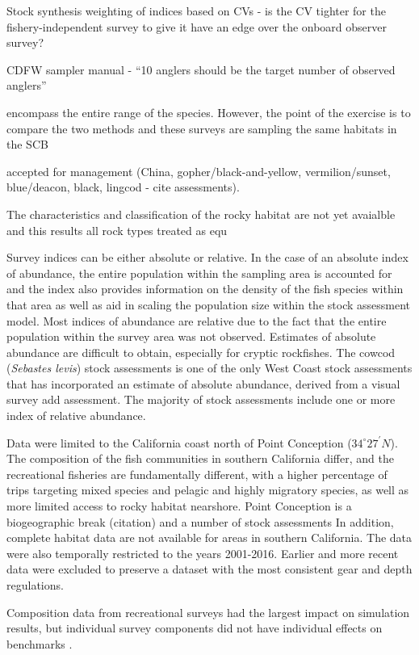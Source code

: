\documentclass[
  authoryear,
  preprint,
  3p]{elsarticle}
\begin{document}
Stock synthesis weighting of indices based on CVs - is the CV tighter
for the fishery-independent survey to give it have an edge over the
onboard observer survey?

CDFW sampler manual - ``10 anglers should be the target number of
observed anglers''

encompass the entire range of the species. However, the point of the
exercise is to compare the two methods and these surveys are sampling
the same habitats in the SCB

accepted for management (China, gopher/black-and-yellow,
vermilion/sunset, blue/deacon, black, lingcod - cite assessments).

The characteristics and classification of the rocky habitat are not yet
avaialble and this results all rock types treated as equ

Survey indices can be either absolute or relative. In the case of an
absolute index of abundance, the entire population within the sampling
area is accounted for and the index also provides information on the
density of the fish species within that area as well as aid in scaling
the population size within the stock assessment model. Most indices of
abundance are relative due to the fact that the entire population within
the survey area was not observed. Estimates of absolute abundance are
difficult to obtain, especially for cryptic rockfishes. The cowcod
(\emph{Sebastes levis}) stock assessments is one of the only West Coast
stock assessments that has incorporated an estimate of absolute
abundance, derived from a visual survey \citep{Love:2009:DFA} add
assessment. The majority of stock assessments include one or more index
of relative abundance.

Data were limited to the California coast north of Point Conception
(\(34^\circ 27^\prime N\)). The composition of the fish communities in
southern California differ, and the recreational fisheries are
fundamentally different, with a higher percentage of trips targeting
mixed species and pelagic and highly migratory species, as well as more
limited access to rocky habitat nearshore. Point Conception is a
biogeographic break (citation) and a number of stock assessments In
addition, complete habitat data are not available for areas in southern
California. The data were also temporally restricted to the years
2001-2016. Earlier and more recent data were excluded to preserve a
dataset with the most consistent gear and depth regulations.

Composition data from recreational surveys had the largest impact on
simulation results, but individual survey components did not have
individual effects on benchmarks \citep{Siegfried:2016:ISA}.\\
\end{document}
